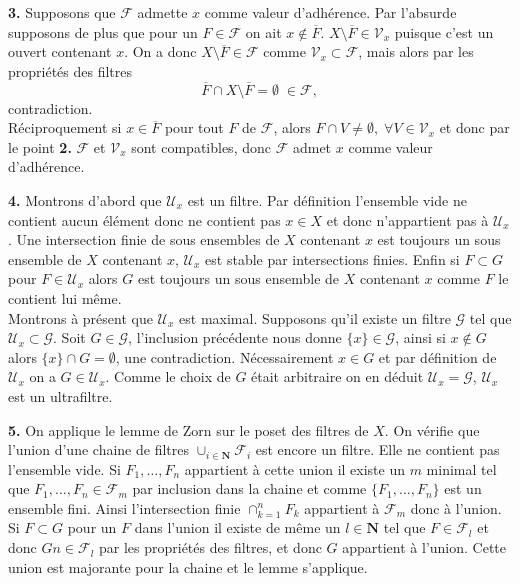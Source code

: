 \documentclass[12pt]{article}
\newcommand{\N}{\mathbf{N}}
\begin{document}
\medskip

\textbf{3.} Supposons que $\mathcal{F}$ admette $x$ comme valeur d'adhérence. Par l'absurde supposons de plus que pour un $F \in \mathcal{F}$ on ait $x \not\in \overline{F}$. $X\setminus\overline{F} \in \mathcal{V}_{x}$ puisque c'est un ouvert contenant $x$. On a donc $X\setminus \overline{F} \in \mathcal{F}$ comme $\mathcal{V}_{x} \subset \mathcal{F}$, mais alors par les propriétés des filtres \[
\overline{F} \cap X \setminus \overline{F} = \emptyset \; \in \mathcal{F}
,\] contradiction. 
\\
Réciproquement si $x \in \overline{F}$ pour tout $F$ de $\mathcal{F}$, alors $F \cap V \neq \emptyset, \; \forall V \in \mathcal{V}_{x}$ et donc par le point \textbf{2.} $\mathcal{F}$ et $\mathcal{V}_{x}$ sont compatibles, donc $\mathcal{F}$ admet $x$ comme valeur d'adhérence.
\medskip

\textbf{4.} Montrons d'abord que $\mathcal{U}_{x}$ est un filtre. Par définition l'ensemble vide ne contient aucun élément donc ne contient pas $x \in X$ et donc n'appartient pas à $\mathcal{U}_{x}$. Une intersection finie de sous ensembles de $X$ contenant $x$ est toujours un sous ensemble de $X$ contenant $x$, $\mathcal{U}_{x}$ est stable par intersections finies. Enfin si $F \subset G$ pour $F \in \mathcal{U}_{x}$ alors $G$ est toujours un sous ensemble de $X$ contenant $x$ comme $F$ le contient lui même.
\\
Montrons à présent que $\mathcal{U}_{x}$ est maximal. Supposons qu'il existe un filtre $\mathcal{G}$ tel que $\mathcal{U}_{x} \subset \mathcal{G}$. Soit $G \in \mathcal{G}$, l'inclusion précédente nous donne $\{x\} \in \mathcal{G}$, ainsi si $ x \not\in G$ alors $\{x\} \cap G = \emptyset$, une contradiction. Nécessairement $x \in G$ et par définition de $\mathcal{U}_{x}$ on a $G \in \mathcal{U}_{x}$. Comme le choix de $G$ était arbitraire on en déduit $\mathcal{U}_{x} = \mathcal{G}$, $\mathcal{U}_{x}$ est un ultrafiltre. 

\medskip

\textbf{5.} On applique le lemme de Zorn sur le poset des filtres de $X$. On vérifie que l'union d'une chaine de filtres $\cup_{i \in \N}\mathcal{F}_{i}$ est encore un filtre. Elle ne contient pas l'ensemble vide. Si  $F_1, \ldots, F_{n}$ appartient à cette union il existe un $m$ minimal tel que  $F_{1}, \ldots, F_{n} \in \mathcal{F}_{m}$ par inclusion dans la chaine et comme $\{F_1, \ldots, F_{n}\}$ est un ensemble fini. Ainsi l'intersection finie $ \cap_{k=1}^{n}F_{k}$ appartient à $\mathcal{F}_{m}$ donc à l'union. Si $F \subset G$ pour un $F$ dans l'union il existe de même un $l \in \N$ tel que $F \in \mathcal{F}_{l}$ et donc $G n\in \mathcal{F}_{l}$ par les propriétés des filtres, et donc $G$ appartient à l'union. Cette union est majorante pour la chaine et le lemme s'applique. 
\end{document}
